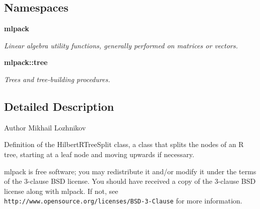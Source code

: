 \subsection*{Namespaces}
\begin{DoxyCompactItemize}
\item 
 {\bf mlpack}
\begin{DoxyCompactList}\small\item\em Linear algebra utility functions, generally performed on matrices or vectors. \end{DoxyCompactList}\item 
 {\bf mlpack\+::tree}
\begin{DoxyCompactList}\small\item\em Trees and tree-\/building procedures. \end{DoxyCompactList}\end{DoxyCompactItemize}


\subsection{Detailed Description}
\begin{DoxyAuthor}{Author}
Mikhail Lozhnikov
\end{DoxyAuthor}
Definition of the Hilbert\+R\+Tree\+Split class, a class that splits the nodes of an R tree, starting at a leaf node and moving upwards if necessary.

mlpack is free software; you may redistribute it and/or modify it under the terms of the 3-\/clause B\+SD license. You should have received a copy of the 3-\/clause B\+SD license along with mlpack. If not, see {\tt http\+://www.\+opensource.\+org/licenses/\+B\+S\+D-\/3-\/\+Clause} for more information. 